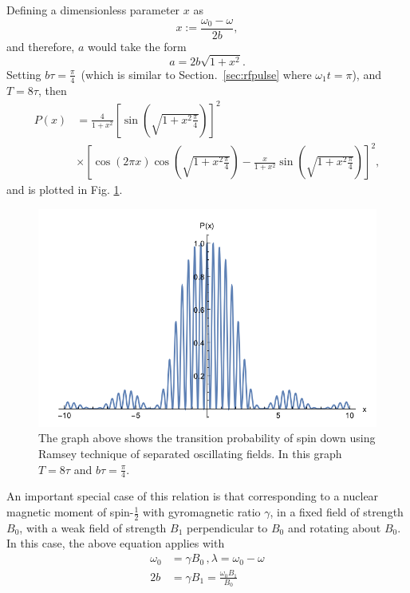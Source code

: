 Defining a dimensionless parameter $x$ as
%
\begin{equation}
x:= \frac{\omega_0 - \omega}{2b} , 
\end{equation}
and therefore, $a$ would take the form 
\begin{equation}
a= 2b \sqrt{1+x^2} .
\end{equation}
Setting $b\tau = \frac{\pi}{4}$~(which is similar to
Section.~\ref{sec:rfpulse} where $\omega_1 t= \pi$), and $T=8\tau$,
then
%
\begin{align}
  P(x) &= \frac{4}{1+x^2} \left[ \sin ( \sqrt{1+x^2 \frac{\pi}{4}}) \right]^2 \\ \nonumber
  & \times
\left[
\cos (2 \pi x) \cos (\sqrt{1+x^2 \frac{\pi}{4}}) - \frac{x}{1+x^2} \sin ( \sqrt{1+x^2 \frac{\pi}{4}}) \right] ^2 ,
\end{align}
%
and is plotted in Fig. \ref{fig:transprob}.
\begin{figure}[h!]
  \centering
  \includegraphics[width=.8\textwidth]{p.png}
  \caption[Transition probability of spin down using Ramsey
  method]{The graph above shows the transition probability of spin
    down using Ramsey technique of separated oscillating fields. In
    this graph $T=8\tau$ and $ b \tau = \frac{\pi}{4}$. }
  \label{fig:transprob}
\end{figure}

An important special case of this relation is that corresponding to a
nuclear magnetic moment of spin-$\frac{1}{2}$ with gyromagnetic ratio
$\gamma$, in a fixed field of strength $B_0$, with a weak field of
strength $B_1$ perpendicular to $B_0$ and rotating about $B_0$. In
this case, the above equation applies with
\begin{align}
\omega_0 &= \gamma B_0 \, , \lambda=\omega_0 - \omega \\
2b &= \gamma B_1 =\frac{\omega_0 B_1}{B_0}
\end{align}
